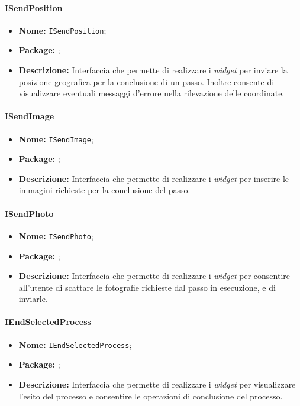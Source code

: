 \paragraph{ISendPosition}
\begin{itemize}
\item \textbf{Nome:} \texttt{ISendPosition};
\item \textbf{Package:} \texttt{\iViewUser{}};
\item \textbf{Descrizione:} Interfaccia che permette  di realizzare i \textit{widget} per inviare la posizione geografica per la conclusione di un passo. Inoltre consente di visualizzare eventuali messaggi d'errore nella rilevazione delle coordinate.
\end{itemize}

\paragraph{ISendImage}
\begin{itemize}
\item \textbf{Nome:} \texttt{ISendImage};
\item \textbf{Package:} \texttt{\iViewUser{}};
\item \textbf{Descrizione:} Interfaccia che permette di realizzare i \textit{widget} per inserire le immagini richieste per la conclusione del passo.
\end{itemize}

\paragraph{ISendPhoto}
\begin{itemize}
\item \textbf{Nome:} \texttt{ISendPhoto};
\item \textbf{Package:} \texttt{\iViewUser{}};
\item \textbf{Descrizione:} Interfaccia che permette di realizzare i \textit{widget} per consentire all'utente di scattare le fotografie richieste dal passo in esecuzione, e di inviarle.
\end{itemize}

\paragraph{IEndSelectedProcess}
\begin{itemize}
\item \textbf{Nome:} \texttt{IEndSelectedProcess};
\item \textbf{Package:} \texttt{\iViewUser{}};
\item \textbf{Descrizione:} Interfaccia che permette di realizzare i \textit{widget} per visualizzare l'esito del processo e consentire le operazioni di conclusione del processo.
\end{itemize}

